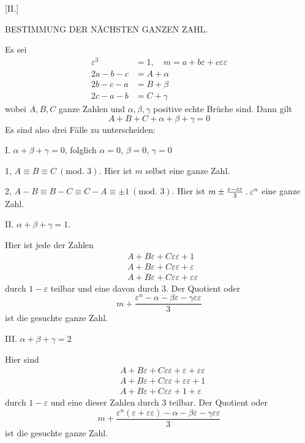 \begin{center}[II.]\par\medskip
BESTIMMUNG DER NÄCHSTEN GANZEN ZAHL.
\end{center}
Es sei
\[
\begin{aligned}
\varepsilon^3&=1,\quad m=a+b\varepsilon+c\varepsilon\varepsilon\\
2a-b-c&=A+\alpha\\
2b-c-a&=B+\beta\\
2c-a-b&=C+\gamma
\end{aligned}
\]
wobei $A,B,C$ ganze Zahlen und $\alpha,\beta,\gamma$ positive echte Brüche sind. Dann gilt
\[
A+B+C+\alpha+\beta+\gamma=0
\]
Es sind also drei Fälle zu unterscheiden:

I. $\alpha+\beta+\gamma=0$, folglich $\alpha=0$, $\beta=0$, $\gamma=0$

1, $A\equiv B\equiv C\ (\text{mod. }3)$. Hier ist $m$ selbst eine ganze Zahl.

2, $A-B\equiv B-C\equiv C-A\equiv\pm1\ (\text{mod. }3)$. Hier ist $m\pm\frac{\varepsilon-\varepsilon\varepsilon}{3}\mathbin{.}\varepsilon^n$ eine ganze Zahl.

II. $\alpha+\beta+\gamma=1$.

Hier ist jede der Zahlen
\[
\begin{aligned}
&A+B\varepsilon+C\varepsilon\varepsilon+1\\
&A+B\varepsilon+C\varepsilon\varepsilon+\varepsilon\\
&A+B\varepsilon+C\varepsilon\varepsilon+\varepsilon\varepsilon
\end{aligned}
\]
%
durch $1-\varepsilon$ teilbar und eine davon durch $3$. Der Quotient oder
\[
m+\frac{\varepsilon^n-\alpha-\beta\varepsilon-\gamma\varepsilon\varepsilon}{3}
\]
ist die gesuchte ganze Zahl.

III. $\alpha+\beta+\gamma=2$

Hier sind
\[
\begin{aligned}
&A+B\varepsilon+C\varepsilon\varepsilon+\varepsilon+\varepsilon\varepsilon\\
&A+B\varepsilon+C\varepsilon\varepsilon+\varepsilon\varepsilon+1\\
&A+B\varepsilon+C\varepsilon\varepsilon+1+\varepsilon
\end{aligned}
\]
durch $1-\varepsilon$ und eine dieser Zahlen durch $3$ teilbar. Der Quotient oder
\[
m+\frac{\varepsilon^n(\varepsilon+\varepsilon\varepsilon)-\alpha-\beta\varepsilon-\gamma\varepsilon\varepsilon}{3}
\]
ist die gesuchte ganze Zahl.

